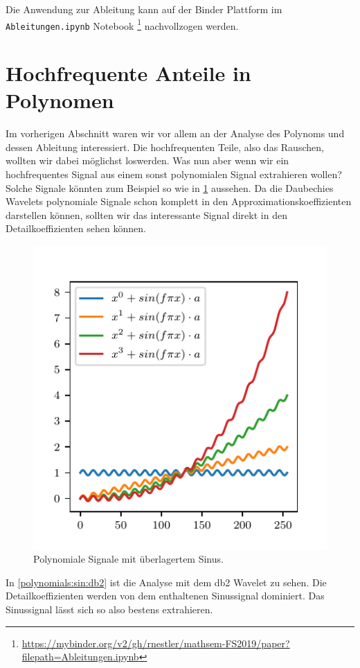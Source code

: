 \begin{refsection}
Die Anwendung zur Ableitung kann auf der Binder Plattform im
\texttt{Ableitungen.ipynb} Notebook%
\footnote{\url{https://mybinder.org/v2/gh/rnestler/mathsem-FS2019/paper?filepath=Ableitungen.ipynb}}
nachvollzogen werden.

\section{Hochfrequente Anteile in Polynomen}

Im vorherigen Abschnitt waren wir vor allem an der Analyse des Polynoms und
dessen Ableitung interessiert. Die hochfrequenten Teile, also das Rauschen,
wollten wir dabei möglichst loswerden. Was nun aber wenn wir ein hochfrequentes
Signal aus einem sonst polynomialen Signal extrahieren wollen? Solche Signale
könnten zum Beispiel so wie in \cref{polynomials:sin:signals} aussehen. Da die
Daubechies Wavelets polynomiale Signale schon komplett in den
Approximationskoeffizienten darstellen können, sollten wir das interessante
Signal direkt in den Detailkoeffizienten sehen können.

\begin{figure}
    \centering
    \includegraphics{papers/polynomials/images/polynomials_sin_signals.pdf}
    \caption{Polynomiale Signale mit überlagertem Sinus.\label{polynomials:sin:signals}}
\end{figure}

In \cref{polynomials:sin:db2} ist die Analyse mit dem db2 Wavelet zu sehen. Die
Detailkoeffizienten werden von dem enthaltenen Sinussignal dominiert. Das
Sinussignal lässt sich so also bestens extrahieren.


\end{refsection}
